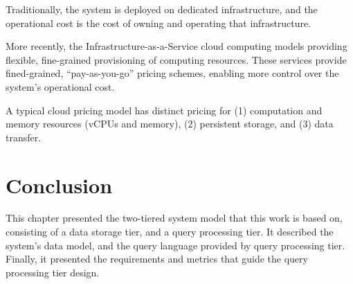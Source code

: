 Traditionally, the system is deployed on dedicated infrastructure,
and the operational cost is the cost of owning and operating that infrastructure.

More recently, the Infrastructure-as-a-Service cloud computing models providing flexible, fine-grained provisioning of computing resources.
These services provide fined-grained, ``pay-as-you-go'' pricing schemes, enabling more control over the system's operational cost.

A typical cloud pricing model \cite{aws:pricing} has distinct pricing for (1) computation and memory resources
(vCPUs and memory), (2) persistent storage, and (3) data transfer.


\section{Conclusion}

This chapter presented the two-tiered system model that this work is based on, consisting of a data storage tier,
and a query processing tier.
It described the system's data model,
and the query language provided by query processing tier.
Finally, it presented the requirements and metrics that guide the query processing tier design.


% 
% 